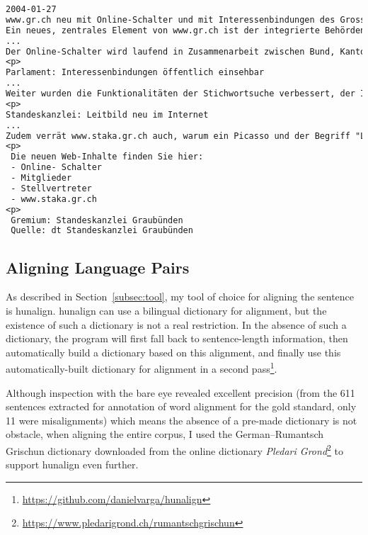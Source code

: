 \begin{lstlisting}[language=txt, caption={[Excerpt from a file containing sentences for alignment.]Excerpt from a  file containing sentences for alignment. 
In order to keep the file structured and increase alignment performance, each document starts with a date and paragraph are boundaries are marked with a special \texttt{<p>} token.}, captionpos=t, label={lst:sentences}]
2004-01-27
www.gr.ch neu mit Online-Schalter und mit Interessenbindungen des Grossen Rats
Ein neues, zentrales Element von www.gr.ch ist der integrierte Behörden-Online-Schalter www.ch.ch.
...
Der Online-Schalter wird laufend in Zusammenarbeit zwischen Bund, Kantonen und Gemeinden weiterentwickelt und inhaltlich erweitert.
<p>
Parlament: Interessenbindungen öffentlich einsehbar 
...
Weiter wurden die Funktionalitäten der Stichwortsuche verbessert, der Informationsgehalt im Bereich "Unser Kanton" erweitert ("Produkte aus Graubünden", Suchmaschine für Graubünden) sowie der Sprachenwechsel zwischen den Inhalten in deutsch, romanisch und italienisch vereinfacht.
<p>
Standeskanzlei: Leitbild neu im Internet 
...
Zudem verrät www.staka.gr.ch auch, warum ein Picasso und der Begriff "Light" ohne weiteres mit der Standeskanzlei Graubünden in Zusammenhang gebracht werden können.
<p>
 Die neuen Web-Inhalte finden Sie hier: 
 - Online- Schalter 
 - Mitglieder 
 - Stellvertreter
 - www.staka.gr.ch 
<p>
 Gremium: Standeskanzlei Graubünden 
 Quelle: dt Standeskanzlei Graubünden
\end{lstlisting}

\subsection{Aligning Language Pairs}
\label{sec:aligning-language-pairs}
As described in Section~\ref{subsec:tool}, my tool of choice for aligning the sentence is hunalign. 
hunalign can use a bilingual dictionary for alignment, but the existence of such a dictionary is not a real restriction. 
In the absence of such a dictionary, the program will first fall back to sentence-length information, then automatically build a dictionary based on this alignment, and finally use this automatically-built dictionary for alignment in a second pass\footnote{\url{https://github.com/danielvarga/hunalign}}.

Although inspection with the bare eye revealed excellent precision (from the 611 sentences extracted for annotation of word alignment for the gold standard, only 11 were misalignments) which means the absence of a pre-made dictionary is not obstacle, when aligning the entire corpus, I used the German--Rumantsch Grischun dictionary downloaded from the online dictionary \emph{Pledari Grond}\footnote{\url{https://www.pledarigrond.ch/rumantschgrischun}} to support hunalign even further.

